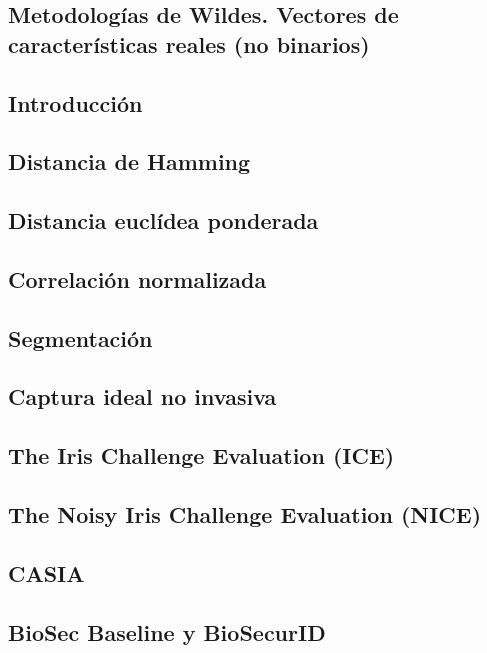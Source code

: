 \subsection{Metodologías de Wildes. Vectores de características reales (no binarios)}


\label{sec:matching}
\subsection{Introducción}
\subsection{Distancia de Hamming} 
\label{subsec:distHamming}
\subsection{Distancia euclídea ponderada}
\subsection{Correlación normalizada}


\label{sec:problematica}
\subsection{Segmentación}
\subsection{Captura ideal no invasiva}


\label{sec:competiciones}
\subsection{The Iris Challenge Evaluation (ICE)}
\subsection{The Noisy Iris Challenge Evaluation (NICE)}


 \label{sec:databases}
\subsection{CASIA} \label{sec:CASIA_database}
\subsection{BioSec Baseline y BioSecurID} \label{sec:ATVS_database}



\newpage \thispagestyle{empty} %